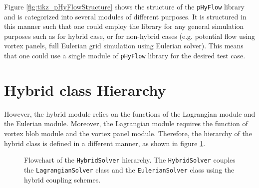 Figure \ref{fig:tikz_pHyFlowStructure} shows the structure of the \texttt{pHyFlow} library and is categorized into several modules of different purposes. It is structured in this manner such that one could employ the library for any general simulation purposes such as for hybrid case, or for non-hybrid cases (e.g. potential flow using vortex panels, full Eulerian grid simulation using Eulerian solver). This means that one could use a single module of \texttt{pHyFlow} library for the desired test case.

\section{Hybrid class Hierarchy}

However, the hybrid module relies on the functions of the Lagrangian module and the Eulerian module. Moreover, the Lagrangian module requires the function of vortex blob module and the vortex panel module. Therefore, the hierarchy of the hybrid class is defined in a different manner, as shown in figure \ref{fig:tikz_hybridStructure}. 

\begin{figure}[h]
\centering
{}
\caption{Flowchart of the \texttt{HybridSolver} hierarchy. The \texttt{HybridSolver} couples the \texttt{LagrangianSolver} class and the \texttt{EulerianSolver} class using the hybrid coupling schemes.}
\label{fig:tikz_hybridStructure}
\end{figure}

